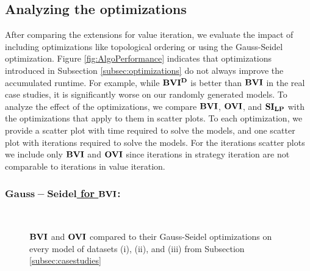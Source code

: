 \subsection{Analyzing the optimizations}
After comparing the extensions for value iteration, we evaluate the impact of including optimizations like topological ordering or using the Gauss-Seidel optimization.
Figure \ref{fig:AlgoPerformance} indicates that optimizations introduced in Subsection \ref{subsec:optimizations} do not always improve the accumulated runtime. 
For example, while $\mathbf{BVI^D}$ is better than $\mathbf{BVI}$ in the real case studies, it is significantly worse on our randomly generated models.
To analyze the effect of the optimizations, we compare $\mathbf{BVI}$, $\mathbf{OVI}$, and $\mathbf{SI_{LP}}$ with the optimizations that apply to them in scatter plots.
To each optimization, we provide a scatter plot with time required to solve the models, and one scatter plot with iterations required to solve the models.
For the iterations scatter plots we include only $\mathbf{BVI}$ and $\mathbf{OVI}$ since iterations in strategy iteration are not comparable to iterations in value iteration.

\subsubsection*{\underline{$\mathbf{Gauss-Seidel}$ for $\mathbf{BVI}$}:}
\begin{figure}[h!]
    \centering
    \
    \caption{$\mathbf{BVI}$ and $\mathbf{OVI}$ compared to their Gauss-Seidel optimizations on every model of datasets (i), (ii), and (iii) from Subsection \ref{subsec:casestudies}}%
    \label{fig:Scatter_G}%
    \end{figure}

